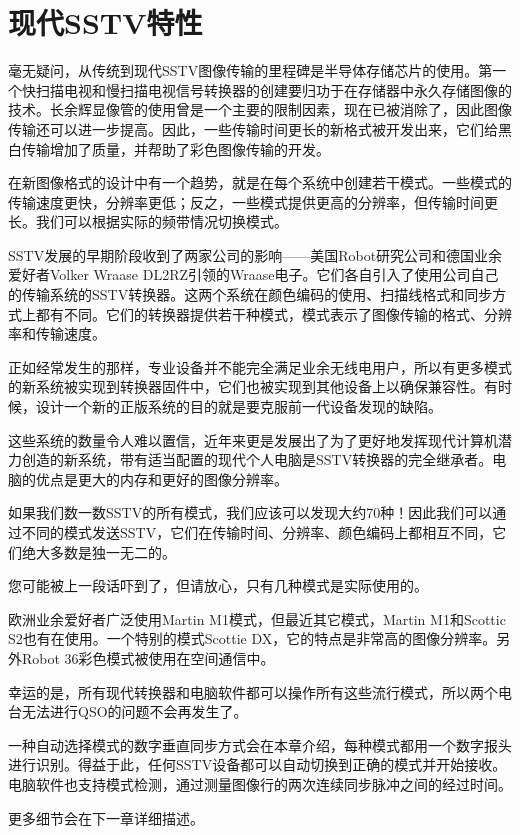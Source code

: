 \chapter{现代SSTV特性}

毫无疑问，从传统到现代SSTV图像传输的里程碑是半导体存储芯片的使用。第一个快扫描电视和慢扫描电视信号转换器的创建要归功于在存储器中永久存储图像的技术。长余辉显像管的使用曾是一个主要的限制因素，现在已被消除了，因此图像传输还可以进一步提高。因此，一些传输时间更长的新格式被开发出来，它们给黑白传输增加了质量，并帮助了彩色图像传输的开发。

在新图像格式的设计中有一个趋势，就是在每个系统中创建若干模式。一些模式的传输速度更快，分辨率更低；反之，一些模式提供更高的分辨率，但传输时间更长。我们可以根据实际的频带情况切换模式。

SSTV发展的早期阶段收到了两家公司的影响——美国Robot研究公司和德国业余爱好者Volker Wraase DL2RZ引领的Wraase电子。它们各自引入了使用公司自己的传输系统的SSTV转换器。这两个系统在颜色编码的使用、扫描线格式和同步方式上都有不同。它们的转换器提供若干种模式，模式表示了图像传输的格式、分辨率和传输速度。

正如经常发生的那样，专业设备并不能完全满足业余无线电用户，所以有更多模式的新系统被实现到转换器固件中，它们也被实现到其他设备上以确保兼容性。有时候，设计一个新的正版系统的目的就是要克服前一代设备发现的缺陷。

这些系统的数量令人难以置信，近年来更是发展出了为了更好地发挥现代计算机潜力创造的新系统，带有适当配置的现代个人电脑是SSTV转换器的完全继承者。电脑的优点是更大的内存和更好的图像分辨率。

如果我们数一数SSTV的所有模式，我们应该可以发现大约70种！因此我们可以通过不同的模式发送SSTV，它们在传输时间、分辨率、颜色编码上都相互不同，它们绝大多数是独一无二的。

您可能被上一段话吓到了，但请放心，只有几种模式是实际使用的。

欧洲业余爱好者广泛使用Martin M1模式，但最近其它模式，Martin M1和Scottic S2也有在使用。一个特别的模式Scottie DX，它的特点是非常高的图像分辨率。另外Robot 36彩色模式被使用在空间通信中。

幸运的是，所有现代转换器和电脑软件都可以操作所有这些流行模式，所以两个电台无法进行QSO的问题不会再发生了。

一种自动选择模式的数字垂直同步方式会在本章介绍，每种模式都用一个数字报头进行识别。得益于此，任何SSTV设备都可以自动切换到正确的模式并开始接收。电脑软件也支持模式检测，通过测量图像行的两次连续同步脉冲之间的经过时间。

更多细节会在下一章详细描述。

